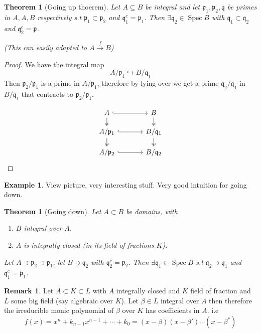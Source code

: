 \documentclass[11pt,a4paper]{article}
\theoremstyle{definition}
\newtheorem{example}[definition]{Example}
\newtheorem{remark}[definition]{Remark}
\theoremstyle{plain}
\newtheorem{theorem}[definition]{Theorem}
\theoremstyle{remark}
\newcommand{\Spec}{\operatorname{Spec}}
\begin{document}
\begin{theorem}[Going up thoerem]
    Let $A \subseteq B$ be integral and let $\mathfrak{p}_1, \mathfrak{p}_2, \mathfrak{q}$ be primes in $A,A,B$ respectively s.t 
    $\mathfrak{p}_1 \subset \mathfrak{p}_2$ and $\mathfrak{q}_1^c = \mathfrak{p}_1$. Then $\exists \mathfrak{q}_2 \in \Spec B$ with 
    $\mathfrak{q_1} \subset \mathfrak{q}_2$ and $\mathfrak{q}_2^c = \mathfrak{p}$. 
    
    (This can easily adapted to $A \xrightarrow{f} B$)
\end{theorem}

\begin{proof}
    We have the integral map
    $$A/ \mathfrak{p}_1 \hookrightarrow B / \mathfrak{q}_1$$
    Then $\mathfrak{p}_2 / \mathfrak{p}_1$ is a prime in $A/\mathfrak{p}_1$, therefore by lying over we get a prime $\mathfrak{q}_2/\mathfrak{q}_1$ in $B/\mathfrak{q}_1$ that 
    contracts to $\mathfrak{p}_2/\mathfrak{p}_1$.

    \[
    \begin{tikzcd}[row sep=1.2em, column sep=3.6em]
    A \arrow[r,hook] \arrow[d,two heads] & B \arrow[d,two heads] \\
    A/\mathfrak p_1 \arrow[r,hook] \arrow[d,two heads] & B/\mathfrak q_1 \arrow[d,two heads] \\
    A/\mathfrak p_2 \arrow[r,hook] & B/\mathfrak q_2
    \end{tikzcd}
    \]
\end{proof}

\begin{example}
    View picture, very interesting stuff. Very good intuition for going down. 
\end{example}

\begin{theorem}[Going down]
    Let $A \subset B$ be domains, with 
    \begin{enumerate}
        \item $B$ integral over $A$.
        \item $A$ is integrally closed (in its field of fractions $K$).
    \end{enumerate}    
    Let $A \supset \mathfrak{p}_2 \supset \mathfrak{p}_1$, let $B \supset \mathfrak{q}_2$ with $\mathfrak{q}_2^c = \mathfrak{p}_2$. 
    Then $\exists \mathfrak{q}_1 \in \Spec B$ s.t $\mathfrak{q}_2 \supset \mathfrak{q}_1$ and $\mathfrak{q}_1^c = \mathfrak{p}_1$. 
\end{theorem}

\begin{remark}
    Let $A \subset K \subset L$ with $A$ integrally closed and $K$ field of fraction and $L$ some big field (say algebraic over $K$). Let $\beta \in L$ integral over $A$ then 
    therefore the irreducible monic polynomial of $\beta$ over $K$ has coefficients in $A$. i.e 
    $$f(x) = x^n + k_{n-1} x^{n-1} + \cdots + k_0 = (x-\beta)(x-\beta')\cdots(x-\beta^*)$$
\end{remark}
\end{document}
